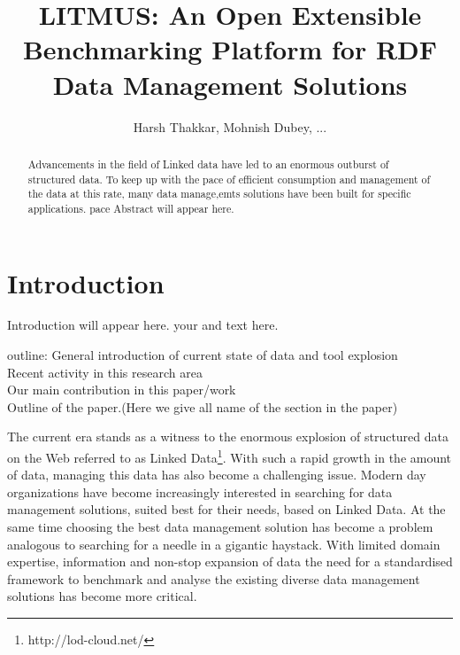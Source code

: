 \documentclass{llncs}
\newcommand{\todoiteminline}[3]{
    \todoitemtemplate{#1}{#2}{#3}{inline}{red}
}
\newcommand{\todoitemtemplate}[5]{%
\todo[#4,color=#5,caption=X]{{#1}{ \textbf{{\tiny{for}} #2}:}{#3}}%
}
\begin{document}
\title{LITMUS: An Open Extensible Benchmarking Platform for RDF Data Management Solutions}


\author{Harsh Thakkar, Mohnish Dubey, ... }


\maketitle

\begin{abstract}

Advancements in the field of Linked data have led to an enormous outburst of structured data. To keep up with the pace of efficient consumption and management of the data at this rate, many data manage,emts solutions have been built for specific applications. pace Abstract will appear here.

\end{abstract}

\section{Introduction}\label{sec:Introduction}
    \todoiteminline{Harsh}{co-authors}{This is pending}
    
    Introduction will appear here. your  and text here. 
    
    {\color{green} outline:
    General introduction of current state of data and tool explosion\\
    Recent activity in this research area\\
    Our main contribution in this paper/work\\
    Outline of the paper.(Here we give all name of the section in the paper)\\ }
    
    The current era stands as a witness to the enormous explosion of structured data on the Web referred to as Linked Data\footnote{http://lod-cloud.net/}. With such a rapid growth in the amount of data, managing this data has also become a challenging issue. Modern day organizations have become increasingly interested in searching for data management solutions, suited best for their needs, based on Linked Data. At the same time choosing the best data management solution has become a problem analogous to searching for a needle in a gigantic haystack. With limited domain expertise, information and non-stop expansion of data the need for a standardised framework to benchmark and analyse the existing diverse data management solutions has become more critical. 
    
\end{document}
